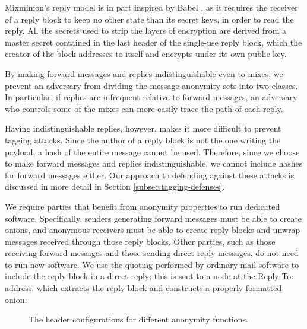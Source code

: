 \documentclass[11pt]{IEEEtran}
\begin{document}
Mixminion's reply
model is in part inspired by Babel \cite{babel}, as it requires the
receiver of a reply block to keep no other state than its secret keys,
in order to read the reply.  All the secrets used
to strip the layers of encryption are derived from a master
secret contained in the last header of the single-use reply block, which
the creator of the block addresses to itself and encrypts under its
own public key.

By making forward messages and replies indistinguishable even to mixes,
we prevent an
adversary from dividing the message anonymity sets into two classes. In
particular, if replies are infrequent relative to forward messages,
an adversary who controls some of the mixes can more easily trace the
path of each reply.

Having indistinguishable replies, however, makes it more difficult to
prevent tagging attacks.  Since the author of a reply block is not the
one writing the payload, a hash of the entire message cannot be used.
Therefore, since we choose to make forward messages and replies
indistinguishable, we cannot include hashes for forward messages either.
Our approach to defending against these attacks is discussed in more
detail in Section \ref{subsec:tagging-defenses}.

We require parties that benefit from anonymity properties to run dedicated
software.  Specifically, senders generating forward messages must be able
to create onions, and anonymous receivers must be able to create reply blocks
and unwrap messages received through those reply blocks. Other parties,
such as those receiving forward messages and those sending direct reply
messages, do not need to run new software. We use the quoting
performed by ordinary mail software to include the reply
block in a direct reply; this is sent to a node at the Reply-To:
address, which extracts the reply block and constructs a properly
formatted onion.

\begin{figure}
\begin{center}
\caption{The header configurations for different anonymity functions.} 
\end{center}
\end{figure}
\end{document}
